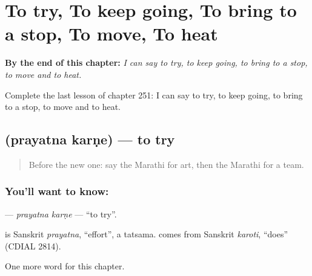 
\chapter{To try, To keep going, To bring to a stop, To move, To heat}
\label{ch:mr-to-try-to-keep-going-to-bring-to-a-stop-to-move-to-heat}

\begin{chapteropening}
\textbf{By the end of this chapter:} \emph{I can say to try, to keep going, to bring to a stop, to move and to heat.}

Complete the last lesson of chapter 251: I can say to try, to keep going, to bring to a stop, to move and to heat.
\end{chapteropening}

\section[\texorpdfstring{\mr{प्रयत्न} \mr{करणे} (prayatna karṇe)}{प्रयत्न करणे (prayatna karṇe)}]{  (prayatna karṇe) — to try}

\label{lesson:MR-C251-prayatna-karne}



\begin{quote}
Before the new one: say the Marathi for art, then the Marathi for a team.
\end{quote}

\subsection*{You'll want to know:  }
\textbf{ } — \emph{prayatna karṇe} — \textquotedblleft{}to try\textquotedblright{}.

\begin{cousinweb}
\textbf{} is Sanskrit \emph{prayatna}, \textquotedblleft{}effort\textquotedblright{}, a tatsama. \textbf{} comes from Sanskrit \emph{karoti}, \textquotedblleft{}does\textquotedblright{} (CDIAL 2814).
\end{cousinweb}

\begin{grammarlens}[title={What you've built}]
One more word for this chapter.
\end{grammarlens}

